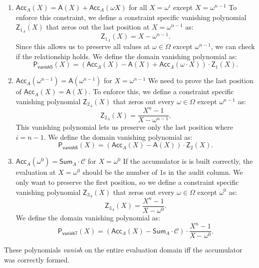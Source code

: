 \begin{enumerate}
    \item $\mathsf{Acc}_A(X) = \mathsf{A}(X) + \mathsf{Acc}_A(\omega X)$ for all $X=\omega^i$ except $X=\omega^{n-1}$
        \newline To enforce this constraint, we define a constraint specific vanishing polynomial $\mathsf{Z}_{1_A}(X)$ that zeros out the last position at $X=\omega^{n-1}$ as:
        \begin{equation}
          \label{eq:za1}
        \mathsf{Z}_{1_A}(X)= X-\omega^{n-1}.
        \end{equation}
        Since this allows us to preserve all values at $\omega\in\Omega$ except $\omega^{n-1}$, we can check if the relationship holds.
        We define the domain vanishing polynomial as:
        \begin{equation}
          \label{eq:5}
        \mathsf{P_{vanish5}}(X)=(\mathsf{Acc}_A(X) - \mathsf{A}(X) + \mathsf{Acc}_A(\omega\cdot X)) \cdot \mathsf{Z}_1(X).
        \end{equation}
    \item $\mathsf{Acc}_A(\omega^{n-1}) = \mathsf{A}(\omega^{n-1})$ for $X=\omega^{n-1}$
        \newline We need to prove the last position of $\mathsf{Acc}_A(X) = \mathsf{A}(X)$. To enforce this, we define a constraint specific vanishing polynomial $\mathsf{Z}_{2_A}(X)$ that zeros out every $\omega\in\Omega$ except $\omega^{n-1}$ as:
        \begin{equation}
          \label{eq:za2}
        \mathsf{Z}_{2_A}(X)= \frac{X^n-1}{X-\omega^{n-1}}.
        \end{equation}
        This vanishing polynomial lets us preserve only the last position where $i=n-1$. We define the domain vanishing polynomial as:
        \begin{equation}
          \label{eq:6}
        \mathsf{P_{vanish6}}(X)=(\mathsf{Acc}_A(X) - \mathsf{A}(X)) \cdot \mathsf{Z}_2(X).
        \end{equation}
    \item $\mathsf{Acc}_A(\omega^0) = \mathsf{Sum}_A\cdot \mathcal{C}$ for $X=\omega^0$
    \newline If the accumulator is is built correctly, the evaluation at $X=\omega^0$ should be the number of 1s in the audit column. 
    We only want to preserve the first position, so we define a constraint specific vanishing polynomial $\mathsf{Z}_{3_A}(X)$ that zeros out every $\omega\in\Omega$ except $\omega^{0}$ as:
    \begin{equation}
      \label{eq:za3}
    \mathsf{Z}_{3_A}(X) = \frac{X^n-1}{X-\omega^{0}}.
    \end{equation}
    We define the domain vanishing polynomial as:
    \begin{equation}
      \label{eq:7}
    \mathsf{P_{vanish7}}(X)=(\mathsf{Acc}_A(X) - \mathsf{Sum}_A\cdot\mathcal{C}) \cdot \frac{X^n-1}{X-\omega^{0}}.
    \end{equation}
\end{enumerate}
        These polynomials \emph{vanish} on the entire evaluation domain iff the accumulator was correctly formed.

